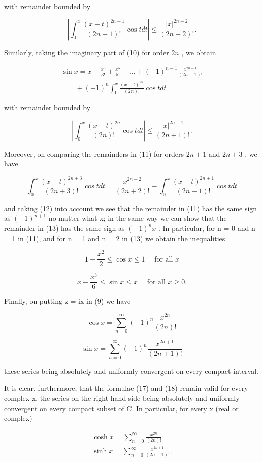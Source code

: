 with remainder bounded by

\[
\left| \int_ {0} ^ {x} \frac {(x - t) ^ {2 n + 1}}{(2 n + 1) !} \cos t d t \right| \leqslant \frac {| x | ^ {2 n + 2}}{(2 n + 2) !}.\tag{12}
\]

Similarly, taking the imaginary part of (10) for order \(2n\) , we obtain

\[
\begin{array}{l} \sin x = x - \frac {x ^ {3}}{3 !} + \frac {x ^ {5}}{5 !} + \dots + (- 1) ^ {n - 1} \frac {x ^ {2 n - 1}}{(2 n - 1) !} \\ \qquad + (- 1) ^ {n} \int_ {0} ^ {x} \frac {(x - t) ^ {2 n}}{(2 n) !} \cos t d t \end{array}\tag{13}
\]

with remainder bounded by

\[
\left| \int_ {0} ^ {x} \frac {(x - t) ^ {2 n}}{(2 n) !} \cos t d t \right| \leqslant \frac {| x | ^ {2 n + 1}}{(2 n + 1) !}.\tag{14}
\]

Moreover, on comparing the remainders in (11) for orders \(2n + 1\) and \(2n + 3\) , we have

\[
\int_ {0} ^ {x} \frac {(x - t) ^ {2 n + 3}}{(2 n + 3) !} \cos t d t = \frac {x ^ {2 n + 2}}{(2 n + 2) !} - \int_ {0} ^ {x} \frac {(x - t) ^ {2 n + 1}}{(2 n + 1) !} \cos t d t
\]

and taking (12) into account we see that the remainder in (11) has the same sign as \((-1)^{n+1}\) no matter what x; in the same way we can show that the remainder in (13) has the same sign as \((-1)^{n}x\) . In particular, for n = 0 and n = 1 in (11), and for n = 1 and n = 2 in (13) we obtain the inequalities

\[
1 - \frac {x ^ {2}}{2} \leqslant \cos x \leqslant 1 \quad \text { for   all } x\tag{15}
\]

\[
x - \frac {x ^ {3}}{6} \leqslant \sin x \leqslant x \quad \text { for   all } x \geqslant 0.\tag{16}
\]

Finally, on putting z = ix in (9) we have

\[
\cos x = \sum_ {n = 0} ^ {\infty} (- 1) ^ {n} \frac {x ^ {2 n}}{(2 n) !}\tag{17}
\]

\[
\sin x = \sum_ {n = 0} ^ {\infty} (- 1) ^ {n} \frac {x ^ {2 n + 1}}{(2 n + 1) !}\tag{18}
\]

these series being absolutely and uniformly convergent on every compact interval.

It is clear, furthermore, that the formulae (17) and (18) remain valid for every complex x, the series on the right-hand side being absolutely and uniformly convergent on every compact subset of C. In particular, for every x (real or complex)

\[
\begin{array}{l} \cosh x = \sum_ {n = 0} ^ {\infty} \frac {x ^ {2 n}}{(2 n) !} \\ \sinh x = \sum_ {n = 0} ^ {\infty} \frac {x ^ {2 n + 1}}{(2 n + 1) !}. \end{array}
\]

